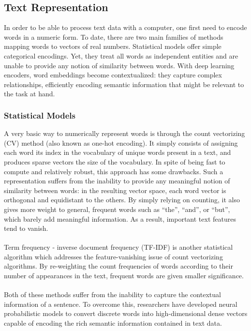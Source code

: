 \documentclass[final]{cvpr}
\begin{document}
\subsection{Text Representation}

In order to be able to process text data with a computer, one first need to encode words in a numeric form. To date, there are two main families of methods mapping words to vectors of real numbers. Statistical models offer simple categorical encodings. Yet, they treat all words as independent entities and are unable to provide any notion of similarity between words. With deep learning encoders, word embeddings become contextualized: they capture complex relationships, efficiently encoding semantic information that might be relevant to the task at hand.

\subsubsection{Statistical Models}

A very basic way to numerically represent words is through the count vectorizing (CV) method (also known as one-hot encoding). It simply consists of assigning each word its index in the vocabulary of unique words present in a text, and produces sparse vectors the size of the vocabulary. In spite of being fast to compute and relatively robust, this approach has some drawbacks. Such a representation suffers from the inability to provide any meaningful notion of similarity between words: in the resulting vector space, each word vector is orthogonal and equidistant to the others. By simply relying on counting, it also gives more weight to general, frequent words such as “the”, “and”, or “but”, which barely add meaningful information.  As a result, important text features tend to vanish.\\
\\
Term frequency - inverse document frequency (TF-IDF) is another statistical algorithm which addresses the feature-vanishing issue of count vectorizing algorithms. By re-weighting the count frequencies of words according to their number of appearances in the text, frequent words are given smaller significance.\\
\\
Both of these methods suffer from the inability to capture the contextual information of a sentence. To overcome this, researchers have developed neural probabilistic models to convert discrete words into high-dimensional dense vectors capable of encoding the rich semantic information contained in text data.
\end{document}
